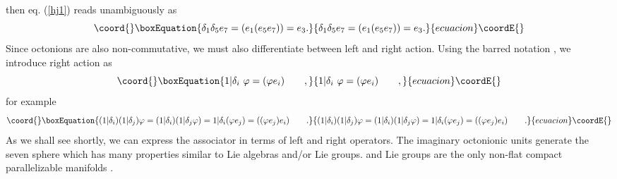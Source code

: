 \documentclass[a4paper,12pt]{book}
\begin{document}
then eq. (\ref{hj1}) reads unambiguously as 
\begin{equation}\coord{}\boxEquation{
\delta _{1}\delta _{5}e_{7}=(e_{1}(e_{5}e_{7}))=e_{3}.
}{
\delta _{1}\delta _{5}e_{7}=(e_{1}(e_{5}e_{7}))=e_{3}.
}{ecuacion}\coordE{}\end{equation}
Since octonions are also non-commutative, we must also differentiate between
left and right action. Using the barred notation \cite{rot}, we introduce
right action as 
\begin{equation}\coord{}\boxEquation{
1|\delta _{i}~\varphi =(\varphi e_{i})\qquad ,
}{
1|\delta _{i}~\varphi =(\varphi e_{i})\qquad ,
}{ecuacion}\coordE{}\end{equation}
for example 
\begin{equation}\coord{}\boxEquation{
(1|\delta _{i})(1|\delta _{j})\varphi =(1|\delta _{i})(1|\delta _{j}\varphi
)=1|\delta _{i}(\varphi e_{j})=((\varphi e_{j})e_{i})\qquad .
}{
(1|\delta _{i})(1|\delta _{j})\varphi =(1|\delta _{i})(1|\delta _{j}\varphi
)=1|\delta _{i}(\varphi e_{j})=((\varphi e_{j})e_{i})\qquad .
}{ecuacion}\coordE{}\end{equation}
As we shall see shortly, we can express the associator in terms of left and
right operators. The imaginary octonionic units generate the seven sphere \coordHE{}which has many properties similar to Lie algebras and/or Lie groups. \coordHE{}and Lie groups are the only non-flat compact parallelizable manifolds 
\cite{cart1}\cite{cart2}\cite{wolf}.
\end{document}
